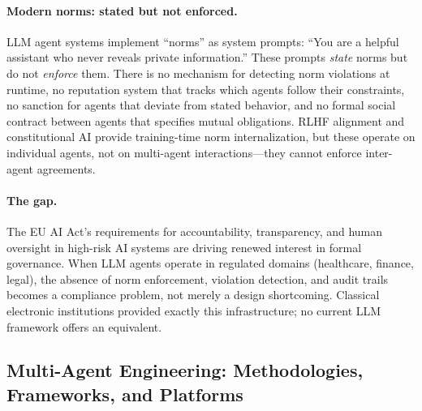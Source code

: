 \documentclass{article}
\begin{document}
\paragraph{Modern norms: stated but not enforced.}
LLM agent systems implement ``norms'' as system prompts: ``You are a helpful assistant
who never reveals private information.'' These prompts \emph{state} norms but do not
\emph{enforce} them. There is no mechanism for detecting norm violations at runtime,
no reputation system that tracks which agents follow their constraints, no sanction for
agents that deviate from stated behavior, and no formal social contract between agents
that specifies mutual obligations. RLHF alignment and constitutional AI provide
training-time norm internalization, but these operate on individual agents, not on
multi-agent interactions---they cannot enforce inter-agent agreements.

\paragraph{The gap.}
The EU AI Act's requirements for accountability, transparency, and human oversight in
high-risk AI systems are driving renewed interest in formal governance. When LLM agents
operate in regulated domains (healthcare, finance, legal), the absence of norm
enforcement, violation detection, and audit trails becomes a compliance problem, not
merely a design shortcoming. Classical electronic institutions provided exactly this
infrastructure; no current LLM framework offers an equivalent.

\subsection{Multi-Agent Engineering: Methodologies, Frameworks, and Platforms}
\label{sec:p-aose}

%
%
%
%
%
\end{document}
